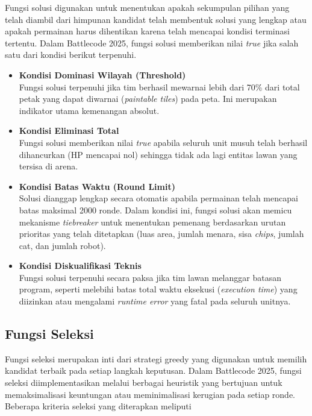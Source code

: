 Fungsi solusi digunakan untuk menentukan apakah sekumpulan pilihan yang telah diambil dari himpunan kandidat telah membentuk solusi yang lengkap atau apakah permainan harus dihentikan karena telah mencapai kondisi terminasi tertentu. Dalam Battlecode 2025, fungsi solusi memberikan nilai \textit{true} jika salah satu dari kondisi berikut terpenuhi.

\begin{itemize}
    \item \textbf{Kondisi Dominasi Wilayah (Threshold)}\\
          Fungsi solusi terpenuhi jika tim berhasil mewarnai lebih dari 70\% dari total petak yang dapat diwarnai (\textit{paintable tiles}) pada peta. Ini merupakan indikator utama kemenangan absolut.

    \item \textbf{Kondisi Eliminasi Total}\\
          Fungsi solusi memberikan nilai \textit{true} apabila seluruh unit musuh telah berhasil dihancurkan (HP mencapai nol) sehingga tidak ada lagi entitas lawan yang tersisa di arena.

    \item \textbf{Kondisi Batas Waktu (Round Limit)}\\
          Solusi dianggap lengkap secara otomatis apabila permainan telah mencapai batas maksimal 2000 ronde. Dalam kondisi ini, fungsi solusi akan memicu mekanisme \textit{tiebreaker} untuk menentukan pemenang berdasarkan urutan prioritas yang telah ditetapkan (luas area, jumlah menara, sisa \textit{chips}, jumlah cat, dan jumlah robot).

    \item \textbf{Kondisi Diskualifikasi Teknis}\\
          Fungsi solusi terpenuhi secara paksa jika tim lawan melanggar batasan program, seperti melebihi batas total waktu eksekusi (\textit{execution time}) yang diizinkan atau mengalami \textit{runtime error} yang fatal pada seluruh unitnya.
\end{itemize}

\subsection{Fungsi Seleksi}

Fungsi seleksi merupakan inti dari strategi greedy yang digunakan untuk memilih kandidat terbaik pada setiap langkah keputusan. Dalam Battlecode 2025, fungsi seleksi diimplementasikan melalui berbagai heuristik yang bertujuan untuk memaksimalisasi keuntungan atau meminimalisasi kerugian pada setiap ronde. Beberapa kriteria seleksi yang diterapkan meliputi

